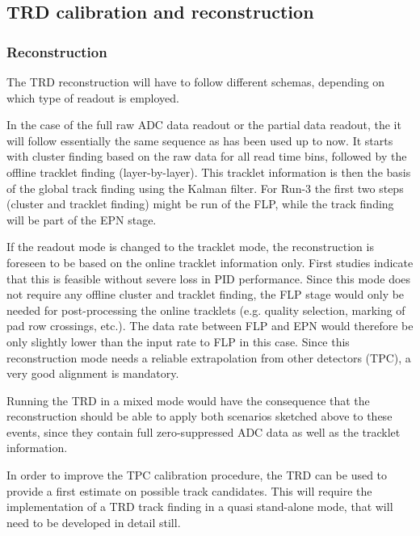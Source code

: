 \subsection{TRD calibration and reconstruction}
\label{TRD:FLP}

\subsubsection{Reconstruction}

The TRD reconstruction will have to follow different schemas,
depending on which type of readout is employed.  

In the case of the full raw ADC data readout or the partial data
readout, the it will follow essentially the same sequence as has been
used up to now.  It starts with cluster finding based on the raw data
for all read time bins, followed by the offline tracklet finding
(layer-by-layer).  This tracklet information is then the basis of the
global track finding using the Kalman filter.  For Run-3 the first two
steps (cluster and tracklet finding) might be run of the FLP, while
the track finding will be part of the EPN stage.

If the readout mode is changed to the tracklet mode, the
reconstruction is foreseen to be based on the online tracklet
information only.  First studies indicate that this is feasible
without severe loss in PID performance.  Since this mode does not
require any offline cluster and tracklet finding, the FLP stage would
only be needed for post-processing the online tracklets (e.g. quality
selection, marking of pad row crossings, etc.).  The data rate between
FLP and EPN would therefore be only slightly lower than the input rate
to FLP in this case.  Since this reconstruction mode needs a reliable
extrapolation from other detectors (TPC), a very good alignment is
mandatory.

Running the TRD in a mixed mode would have the consequence that the
reconstruction should be able to apply both scenarios sketched above
to these events, since they contain full zero-suppressed ADC data as
well as the tracklet information.

In order to improve the TPC calibration procedure, the TRD can be used
to provide a first estimate on possible track candidates.  This will
require the implementation of a TRD track finding in a quasi
stand-alone mode, that will need to be developed in detail still.

